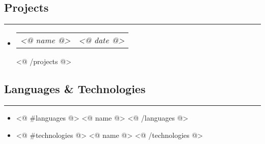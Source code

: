 \documentclass[11pt,letterpaper]{article}
\makeatletter
\newcommand{\headerrow}[2]
{\begin{tabular*}{\linewidth}{l@{\extracolsep{\fill}}r}
    #1 &
    #2 \\
\end{tabular*}}
\makeatother
\begin{document}
\vspace{-1.5em}
\subsection*{Projects}
\vspace{-0.4em}
\hrule

\begin{itemize}[label={},leftmargin=*]
\parskip=0.1em

<@ #projects @>

\item
\headerrow
{\emph{ <@ name @>}}
{\emph{ <@ date @>}}

<@ /projects @>

\end{itemize}


\vspace{-.6em}
\subsection*{Languages \& Technologies}
\vspace{-0.4em}
\hrule

\begin{itemize}[leftmargin=*]
\parskip=0.1em


\item <@ #languages @> <@ name @> <@ /languages @>
\item <@ #technologies @> <@ name @> <@ /technologies @>
\end{itemize}
\end{document}
